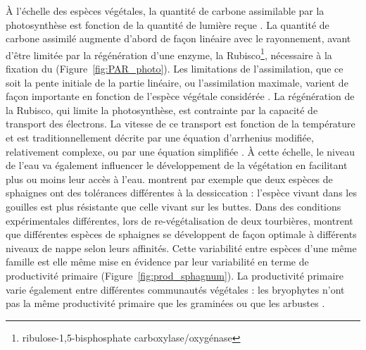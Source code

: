 À l'échelle des espèces végétales, la quantité de carbone assimilable par la photosynthèse est fonction de la quantité de lumière reçue \citep{long1993}.
La quantité de carbone assimilé augmente d'abord de façon linéaire avec le rayonnement, avant d'être limitée par la régénération d'une enzyme, la Rubisco\footnote{ribulose-1,5-bisphosphate carboxylase/oxygénase}, nécessaire à la fixation du \coo (Figure~\ref{fig:PAR_photo}).
Les limitations de l'assimilation, que ce soit la pente initiale de la partie linéaire, ou l'assimilation maximale, varient de façon importante en fonction de l'espèce végétale considérée \citep{wullschleger1993}.
La régénération de la Rubisco, qui limite la photosynthèse, est contrainte par la capacité de transport des électrons.
La vitesse de ce transport est fonction de la température et est traditionnellement décrite par une équation d'arrhenius modifiée, relativement complexe, ou par une équation simplifiée \citep{farquhar1980,june2004}.
À cette échelle, le niveau de l'eau va également influencer le développement de la végétation en facilitant plus ou moins leur accès à l'eau.
\citet{wagner1984} montrent par exemple que deux espèces de sphaignes ont des tolérances différentes à la dessiccation : l'espèce vivant dans les gouilles est plus résistante que celle vivant sur les buttes.
Dans des conditions expérimentales différentes, lors de re-végétalisation de deux tourbières, \cite{robroek2009} montrent que différentes espèces de sphaignes se développent de façon optimale à différents niveaux de nappe selon leurs affinités.
Cette variabilité entre espèces d'une même famille est elle même mise en évidence par leur variabilité en terme de productivité primaire (Figure~\ref{fig:prod_sphagnum}).
La productivité primaire varie également entre différentes communautés végétales : les bryophytes n'ont pas la même productivité primaire que les graminées ou que les arbustes \citetext{\citealp{moore2002} dans \citealp{rydin2013b}}.

